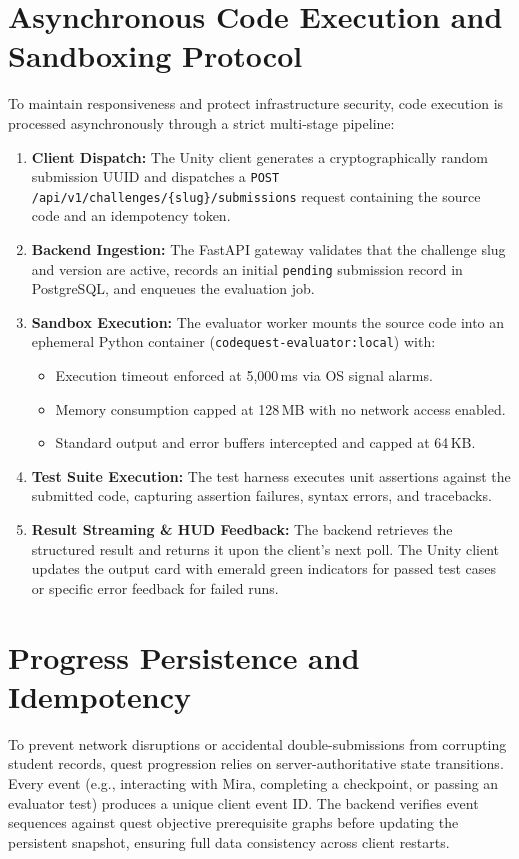 \section{Asynchronous Code Execution and Sandboxing Protocol}
To maintain responsiveness and protect infrastructure security, code execution is processed asynchronously through a strict multi-stage pipeline:
\begin{enumerate}
    \item \textbf{Client Dispatch:} The Unity client generates a cryptographically random submission UUID and dispatches a \texttt{POST /api/v1/challenges/\{slug\}/submissions} request containing the source code and an idempotency token.
    \item \textbf{Backend Ingestion:} The FastAPI gateway validates that the challenge slug and version are active, records an initial \texttt{pending} submission record in PostgreSQL, and enqueues the evaluation job.
    \item \textbf{Sandbox Execution:} The evaluator worker mounts the source code into an ephemeral Python container (\texttt{codequest-evaluator:local}) with:
    \begin{itemize}
        \item Execution timeout enforced at 5,000\,ms via OS signal alarms.
        \item Memory consumption capped at 128\,MB with no network access enabled.
        \item Standard output and error buffers intercepted and capped at 64\,KB.
    \end{itemize}
    \item \textbf{Test Suite Execution:} The test harness executes unit assertions against the submitted code, capturing assertion failures, syntax errors, and tracebacks.
    \item \textbf{Result Streaming \& HUD Feedback:} The backend retrieves the structured result and returns it upon the client's next poll. The Unity client updates the output card with emerald green indicators for passed test cases or specific error feedback for failed runs.
\end{enumerate}

\section{Progress Persistence and Idempotency}
To prevent network disruptions or accidental double-submissions from corrupting student records, quest progression relies on server-authoritative state transitions. Every event (e.g., interacting with Mira, completing a checkpoint, or passing an evaluator test) produces a unique client event ID. The backend verifies event sequences against quest objective prerequisite graphs before updating the persistent snapshot, ensuring full data consistency across client restarts.
